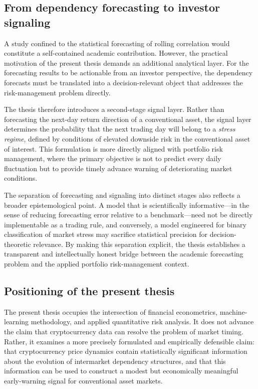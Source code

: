 \subsection{From dependency forecasting to investor signaling}

A study confined to the statistical forecasting of rolling correlation would constitute a self-contained academic contribution. However, the practical motivation of the present thesis demands an additional analytical layer. For the forecasting results to be actionable from an investor perspective, the dependency forecasts must be translated into a decision-relevant object that addresses the risk-management problem directly.

The thesis therefore introduces a second-stage signal layer. Rather than forecasting the next-day return direction of a conventional asset, the signal layer determines the probability that the next trading day will belong to a \emph{stress regime}, defined by conditions of elevated downside risk in the conventional asset of interest. This formulation is more directly aligned with portfolio risk management, where the primary objective is not to predict every daily fluctuation but to provide timely advance warning of deteriorating market conditions.

The separation of forecasting and signaling into distinct stages also reflects a broader epistemological point. A model that is scientifically informative---in the sense of reducing forecasting error relative to a benchmark---need not be directly implementable as a trading rule, and conversely, a model engineered for binary classification of market stress may sacrifice statistical precision for decision-theoretic relevance. By making this separation explicit, the thesis establishes a transparent and intellectually honest bridge between the academic forecasting problem and the applied portfolio risk-management context.

\subsection{Positioning of the present thesis}

The present thesis occupies the intersection of financial econometrics, machine-learning methodology, and applied quantitative risk analysis. It does not advance the claim that cryptocurrency data can resolve the problem of market timing. Rather, it examines a more precisely formulated and empirically defensible claim: that cryptocurrency price dynamics contain statistically significant information about the evolution of intermarket dependency structures, and that this information can be used to construct a modest but economically meaningful early-warning signal for conventional asset markets.

